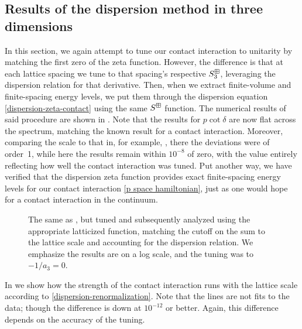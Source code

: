 
\subsection{Results of the dispersion method in three dimensions}

In this section, we again attempt to tune our contact interaction to unitarity by matching the first zero of the zeta function.
However, the difference is that at each lattice spacing we tune to that spacing's respective $S^{\boxplus}_3$, leveraging the dispersion relation for that derivative.
Then, when we extract finite-volume and finite-spacing energy levels, we put them through the dispersion equation \eqref{dispersion-zeta-contact} using the same $S^{\boxplus}$ function.
The numerical results of said procedure are shown in .
Note that the results for $p\cot\delta$ are now flat across the spectrum, matching the known result for a contact interaction.
Moreover, comparing the scale to that in, for example, , there the deviations were of order~1, while here the results remain within $10^{-8}$ of zero, with the value entirely reflecting how well the contact interaction was tuned.
Put another way, we have verified that the dispersion zeta function provides exact finite-spacing energy levels for our contact interaction \eqref{p space hamiltonian}, just as one would hope for a contact interaction in the continuum.

\begin{figure}[!htb]
	\centering
    \scalebox{0.8}{}
    \caption{The same as , but tuned and subsequently analyzed using the appropriate latticized \Luscher function, matching the cutoff on the sum to the lattice scale and accounting for the dispersion relation.
    We emphasize the results are on a log scale, and the tuning was to $-1/a_3 = 0$.
    }
    \label{fig:unimproved dispersion}
\end{figure}

In  we show how the strength of the contact interaction runs with the lattice scale according to \eqref{dispersion-renormalization}.
Note that the lines are not fits to the data; though the difference is down at $10^{-12}$ or better.
Again, this difference depends on the accuracy of the tuning.

